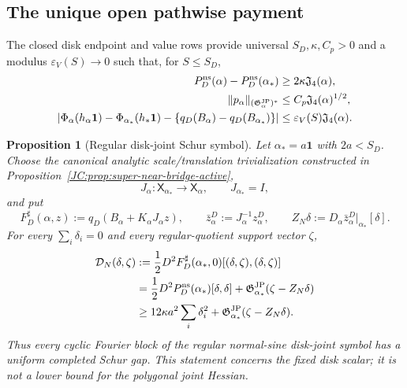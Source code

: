\documentclass[11pt]{amsart}
\numberwithin{equation}{section}
\newtheorem{proposition}[theorem]{Proposition}
\theoremstyle{definition}
\theoremstyle{remark}
\newcommand{\Jfour}{\mathfrak J_4}
\newcommand{\Gjp}{\mathfrak G^{\rm JP}}
\begin{document}
\subsection{The unique open pathwise payment}

The closed disk endpoint and value rows provide universal
$S_D,\kappa,C_p>0$ and a modulus $\varepsilon_V(S)\to0$ such that, for
$S\le S_D$,
\begin{align}
 P_D^{\rm ns}(\alpha)-P_D^{\rm ns}(\alpha_*)
 &\ge2\kappa\Jfour(\alpha),\label{JC:eq:D0}\\
 \|p_\alpha\|_{(\Gjp_\alpha)^*}
 &\le C_p\Jfour(\alpha)^{1/2},\label{JC:eq:P}\\
 \left|\Phi_\alpha(h_\alpha\mathbf1)
 -\Phi_{\alpha_*}(h_*\mathbf1)
 -\{q_D(B_\alpha)-q_D(B_{\alpha_*})\}\right|
 &\le\varepsilon_V(S)\Jfour(\alpha).
 \label{JC:eq:V}
\end{align}

\begin{proposition}[Regular disk-joint Schur symbol]
\label{JC:prop:regular-disk-joint}
Let $\alpha_*=a\mathbf1$ with $2a<S_D$.  Choose the canonical analytic
scale/translation trivialization constructed in
Proposition~\ref{JC:prop:super-near-bridge-active},
\[
 J_\alpha:\mathsf X_{\alpha_*}\longrightarrow\mathsf X_\alpha,
 \qquad J_{\alpha_*}=I,
\]
and put
\[
 F_D^\sharp(\alpha,z):=
 q_D(B_\alpha+K_\alpha J_\alpha z),\qquad
 \bar z_\alpha^D:=J_\alpha^{-1}z_\alpha^D,\qquad
 Z_N\delta:=
 D_\alpha\bar z_\alpha^D\big|_{\alpha_*}[\delta].
\]
For every $\sum_i\delta_i=0$ and every regular-quotient support vector
$\zeta$,
\begin{align}
 \mathcal D_N(\delta,\zeta)
 &:=
 \frac12D^2F_D^\sharp(\alpha_*,0)
 [(\delta,\zeta),(\delta,\zeta)]
 \label{JC:eq:regular-disk-joint-identity}\\
 &=
 \frac12D^2P_D^{\rm ns}(\alpha_*)[\delta,\delta]
 +\Gjp_{\alpha_*}(\zeta-Z_N\delta)
 \notag\\
 &\ge
 12\kappa a^2\sum_i\delta_i^2
 +\Gjp_{\alpha_*}(\zeta-Z_N\delta).
 \label{JC:eq:regular-disk-joint-gap}
\end{align}
Thus every cyclic Fourier block of the regular
\emph{normal-sine disk-joint} symbol has a uniform completed Schur gap.
This statement concerns the fixed disk scalar; it is not a lower bound
for the polygonal joint Hessian.
\end{proposition}
\end{document}
